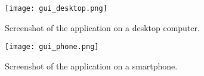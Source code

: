 \begin{figure}[htbp]
    \centering
\texttt{[image: gui\_desktop.png]}
\caption{Screenshot of the application on a desktop computer.}
\label{desktopscreenshot}
\end{figure}
\begin{figure}[htbp]
    \centering
\texttt{[image: gui\_phone.png]}
\caption{Screenshot of the application on a smartphone.}
\label{phonescreenshot}
\end{figure}